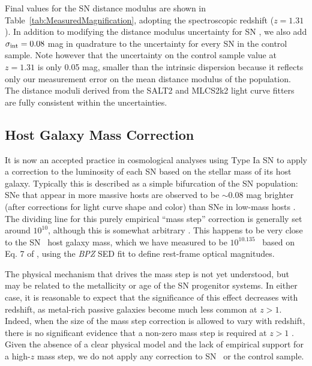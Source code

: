 Final values for the SN distance modulus are shown in
Table~\ref{tab:MeasuredMagnification}, adopting the spectroscopic
redshift ($z=1.31$).  In addition to modifying the distance modulus
uncertainty for SN \tomas, we also add $\sigma_{\rm int}=0.08$ mag in
quadrature to the uncertainty for every SN in the control sample. Note
however that the uncertainty on the control sample value at $z=1.31$
is only 0.05 mag, smaller than the intrinsic dispersion because it
reflects only our measurement error on the mean distance modulus of
the population.  The distance moduli derived from the SALT2 and
MLCS2k2 light curve fitters are fully consistent within the
uncertainties. 

\subsection{Host Galaxy Mass Correction}
\label{sec:HostGalaxyMassCorrection}

It is now an accepted practice in cosmological analyses using Type Ia
SN to apply a correction to the luminosity of each SN based on the
stellar mass of its host galaxy. Typically this is described as a
simple bifurcation of the SN population: SNe that appear in more
massive hosts are observed to be $\sim$0.08 mag brighter (after
corrections for light curve shape and color) than SNe in low-mass
hosts \citep{Kelly:2010,Sullivan:2010}.  The dividing line for this
purely empirical ``mass step'' correction is generally set around
$10^{10}$\Msun, although this is somewhat arbitrary \citep[see
e.g.][]{Betoule:2014}.  This happens to be very close to the
SN \tomas\ host galaxy mass, which we have measured to be
$10^{10.135}$ \Msun\ based on Eq. 7 of \citet{Taylor:2011}, using the
{\it BPZ} SED fit to define rest-frame optical magnitudes.


The physical mechanism that drives the mass step is not yet
understood, but may be related to the metallicity or age of the SN
progenitor systems. In either case, it is reasonable to expect that
the significance of this effect decreases with redshift, as metal-rich
passive galaxies become much less common at $z>1$.  Indeed, when the
size of the mass step correction is allowed to vary with redshift,
there is no significant evidence that a non-zero mass step is required
at $z>1$ \citep{Rigault:2013,Shafer:2014,Betoule:2014}.  Given the
absence of a clear physical model and the lack of empirical support
for a high-$z$ mass step, we do not apply any correction to SN \tomas\ 
or the control sample.  

